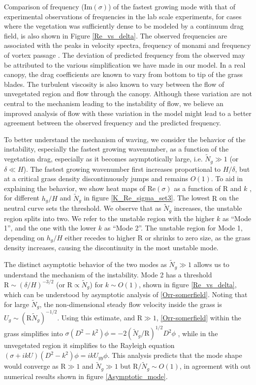 \documentclass[aps,prl,reprint,twocolumn,showpacs,superscriptaddress,10pt]{revtex4-1}  %
\newcommand{\hg}{h_g}
\newcommand{\Rey}{\text{R}}
\newcommand{\Ndg}{\tilde{N}_g}
\newcommand{\shreyas}[1]{}
\begin{document}
Comparison of frequency (Im$(\sigma)$) of the fastest growing mode with that of experimental observations of frequencies in the lab scale experiments, for cases where the vegetation was sufficiently dense to be modeled by a continuum drag field, is also shown in 
Figure \ref{Re_vs_delta}. The observed frequencies are associated with the peaks in velocity spectra, frequency of monami and frequency of vortex passage \cite{Ghisal02}\shreyas{cite someone}. The deviation of predicted frequency from the observed may be attributed to the various 
simplification we have made in our model. In a real canopy, the drag coefficients are known to
vary from bottom to tip of the grass blades\cite{Vivoni98,Nepf00}. The turbulent viscosity is also known to vary between the flow of unvegetated region and flow through the canopy\cite{Ghisal02}. Although these variation
are not central to the mechanism leading to the instability of flow, we believe an improved analysis of flow with these variation in the model might lead to a better agreement between the
observed frequency and the predicted frequency.

To better understand the mechanism of waving, we consider the behavior of the instability, especially the fastest growing wavenumber, as a function of the vegetation drag, especially as it becomes asymptotically large, i.e. $\Ndg \gg 1$ (or $\delta \ll H$).
The fastest growing wavenumber first increases proportional to $H/\delta$, but at a critical grass density discontinuously jumps and remains $O(1)$. 
To aid in explaining the behavior, we show heat maps of Re$(\sigma)$ as a function of $\Rey$ and $k$ \shreyas{Make sure to remone $H$ from $kH$ because $k$ is dimensionless.}, for different $\hg/H$ and $\Ndg$ in figure \ref{K_Re_sigma_set3}. 
The lowest $\Rey$ on the neutral curve sets the threshold. 
We observe that as $\Ndg$ increases, the unstable region splits into two. We refer to the unstable region with the higher $k$ as ``Mode 1'', and the one with the lower $k$ as ``Mode 2''. 
The unstable region for Mode 1, depending on $\hg/H$ either recedes to higher $\Rey$ or shrinks to zero size, as the grass density increases, causing the discontinuity in the most unstable mode.

The distinct asymptotic behavior of the two modes as $\Ndg \gg 1$ allows us to understand the mechanism of the instability. 
Mode 2 has a threshold $\Rey \sim ({\delta}/{H})^{-3/2}$ (or $\Rey \propto \Ndg$) for $k\sim O(1)$, shown in figure \ref{Re_vs_delta}, which can be understood by asymptotic analysis of \eqref{Orr-somerfield}.
Noting that for large $\Ndg$, the non-dimensional steady flow velocity inside the grass is $U_g \sim (\Rey \Ndg)^{-1/2}$. 
Using this estimate, and $\Rey\gg1$, \eqref{Orr-somerfield} within the grass simplifies into $\sigma\left(D^2-k^2\right)\phi = -2{(\Ndg/\Rey)^{1/2}}D^2\phi$ \shreyas{check sign}, while in the unvegetated region it simplifies to the Rayleigh equation $ \left(\sigma+ikU\right) \left(D^2-k^2\right)\phi =  ikU_{yy}\phi$. 
This analysis predicts that the mode shape would converge as $\Rey\gg 1$ and $\Ndg \gg 1$ but $\Rey/\Ndg \sim O(1)$, in agreement with out numerical results shown in figure \ref{Asymptotic_mode}. 
\end{document}
